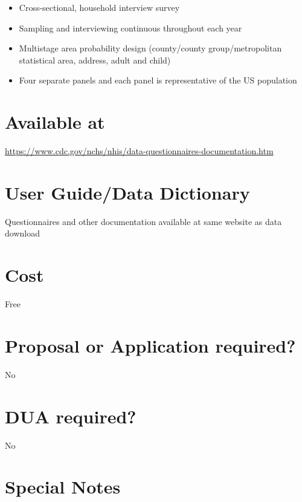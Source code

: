 \documentclass[
]{book}
\providecommand{\tightlist}{%
  \setlength{\itemsep}{0pt}\setlength{\parskip}{0pt}}
\begin{document}
\begin{itemize}
\tightlist
\item
  Cross-sectional, household interview survey
\item
  Sampling and interviewing continuous throughout each year
\item
  Multistage area probability design (county/county group/metropolitan statistical area, address, adult and child)
\item
  Four separate panels and each panel is representative of the US population
\end{itemize}

\hypertarget{available-at-51}{%
\section{Available at}\label{available-at-51}}

\url{https://www.cdc.gov/nchs/nhis/data-questionnaires-documentation.htm}

\hypertarget{user-guidedata-dictionary-51}{%
\section{User Guide/Data Dictionary}\label{user-guidedata-dictionary-51}}

Questionnaires and other documentation available at same website as data download

\hypertarget{cost-51}{%
\section{Cost}\label{cost-51}}

Free

\hypertarget{proposal-or-application-required-51}{%
\section{Proposal or Application required?}\label{proposal-or-application-required-51}}

No

\hypertarget{dua-required-51}{%
\section{DUA required?}\label{dua-required-51}}

No

\hypertarget{special-notes-51}{%
\section{Special Notes}\label{special-notes-51}}
\end{document}
